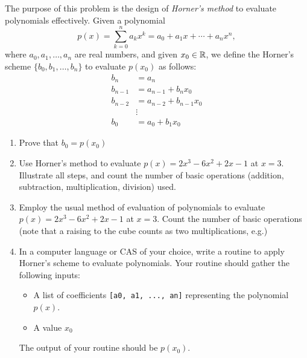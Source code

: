 \begin{problem}[CAS]
The purpose of this problem is the design of \emph{Horner's method} to evaluate polynomials effectively.  Given a polynomial
\begin{equation*}
p(x) = \sum_{k=0}^n a_k x^k = a_0 + a_1 x + \dotsb + a_n x^n,
\end{equation*}
where $a_0, a_1, \dotsc, a_n$ are real numbers, and given $x_0 \in \mathbb{R}$, we define the Horner's scheme $\{ b_0, b_1, \dotsc, b_n \}$ to evaluate $p(x_0)$ as follows:
\begin{align*}
b_n &= a_n \\
b_{n-1} &= a_{n-1} + b_n x_0 \\
b_{n-2} &= a_{n-2} + b_{n-1} x_0 \\
&\vdots \\
b_0 &= a_0 + b_1 x_0
\end{align*}
\begin{enumerate}
	\item Prove that $b_0 = p(x_0)$
	\item Use Horner's method to evaluate $p(x) = 2x^3 - 6x^2 +2x -1$ at $x=3$.  Illustrate all steps, and count the number of basic operations (addition, subtraction, multiplication, division) used.
	\item Employ the usual method of evaluation of polynomials to evaluate $p(x) = 2x^3 - 6x^2 +2x -1$ at $x=3$.  Count the number of basic operations (note that a raising to the cube counts as two multiplications, e.g.)
	\item In a computer language or CAS of your choice, write a routine to apply Horner's scheme to evaluate polynomials.  Your routine should gather the following inputs:
	\begin{itemize}
		\item A list of coefficients \texttt{[a0, a1, ..., an]} representing the polynomial $p(x)$.
		\item A value $x_0$
	\end{itemize}
	The output of your routine should be $p(x_0)$.
\end{enumerate}
\end{problem}


